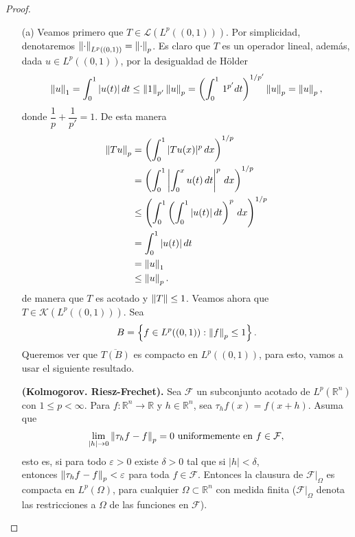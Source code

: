 \begin{proof}
    \begin{enumerate}
        \item[(a)] Veamos primero que $T\in \mathcal{L}(L^p((0,1)))$. Por simplicidad, denotaremos $\left\|\cdot\right\|_{L^p((0,1))}=\left\|\cdot\right\|_p$. Es claro que $T$ es un operador lineal, además, dada $u \in L^p((0,1))$, por la desigualdad de Hölder
        \begin{align*}
            \left\|u\right\|_1=\int_0^1|u(t)|\, dt\leq \left\|1\right\|_{p'}\left\|u\right\|_p=\left(\int_0^1 \, 1^{p'}dt\right)^{1/p'}\left\|u\right\|_p=\left\|u\right\|_p,
        \end{align*}
        donde $\dfrac{1}{p}+\dfrac{1}{p'}=1$. De esta manera
        \begin{align*}
            \left\|Tu\right\|_p&=\left(\int_{0}^1 |Tu(x)|^p\, dx\right)^{1/p}\\
            &=\left(\int_0^1 \left|\int_0^x u(t)\, dt\right|^p\, dx\right)^{1/p}\\
            &\leq \left(\int_{0}^1\left(\int_0^1 |u(t)|\, dt\right)^p\, dx\right)^{1/p}\\
            &=\int_0^1 |u(t)|\, dt\\
            &=\left\|u\right\|_1\\
            &\leq \left\|u\right\|_p.
        \end{align*}
        de manera que $T$ es acotado y $\left\|T\right\|\leq 1$. Veamos ahora que $T \in \mathcal{K}(L^p((0,1)))$. Sea
        \begin{align*}
            B=\left\{f \in L^p((0,1)): \left\|f\right\|_p\leq 1\right\}.
        \end{align*}
        Queremos ver que $\overline{T(B)}$ es compacto en $L^p((0,1))$, para esto, vamos a usar el siguiente resultado.
        \begin{theorem}
            \textbf{(Kolmogorov. Riesz-Frechet).} Sea $\mathcal{F}$ un subconjunto acotado de $L^p(\mathbb{R}^n)$ con $1\leq p<\infty$. Para $f:\mathbb{R}^n\to \mathbb{R}$ y $h \in \mathbb{R}^n$, sea $\tau_h f(x)=f(x+h)$. Asuma que
            \begin{align*}
                \lim_{|h|\to 0}\left\|\tau_h f-f\right\|_p=0 \text{ uniformemente en } f \in\mathcal{F},
            \end{align*}
            esto es, si para todo $\varepsilon>0$ existe $\delta>0$ tal que si $|h|<\delta$,\\ entonces $\left\|\tau_h f-f\right\|_p<\varepsilon$ para toda $f \in \mathcal{F}$. Entonces la clausura de $\mathcal{F}\big|_{\Omega}$ es compacta en $L^p(\Omega)$, para cualquier $\Omega\subset \mathbb{R}^n$ con medida finita ($\mathcal{F}\big|_\Omega$ denota las restricciones a $\Omega$ de las funciones en $\mathcal{F}$).
        \end{theorem}


\end{enumerate}
\end{proof}
